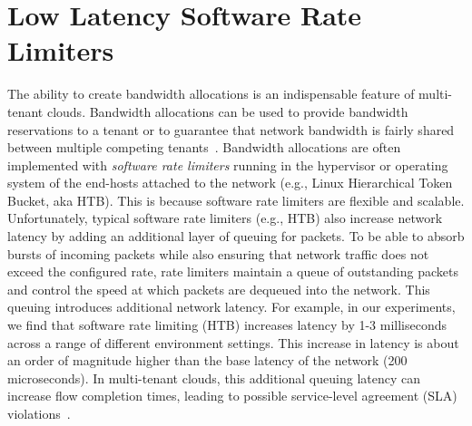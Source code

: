 \section{Low Latency Software Rate Limiters}
The ability to create bandwidth allocations is an indispensable feature
of multi-tenant clouds.  Bandwidth allocations can be used to provide
bandwidth reservations to a tenant or to guarantee that network
bandwidth is fairly shared between multiple competing
tenants~\cite{shieh2011sharing,jeyakumar2013eyeq,rodrigues2011gatekeeper}.
Bandwidth allocations are often implemented with \textit{software rate
limiters} running in the hypervisor or operating system
of the end-hosts attached to the network (e.g., Linux Hierarchical Token
Bucket, aka HTB).  This is because software rate limiters are flexible
and scalable.
Unfortunately, typical software rate limiters (e.g., HTB) also increase
network latency by adding an additional layer of queuing for packets.
To be able to absorb bursts of incoming packets while also ensuring that
network traffic does not exceed the configured rate, rate limiters
maintain a queue of outstanding packets and control the speed at which
packets are dequeued into the network.  This queuing introduces
additional network latency.  For example, in our experiments, we find
that software rate limiting (HTB) increases latency by 1-3 milliseconds
across a range of different environment settings. This increase in
latency is about an order of magnitude higher than the base latency of
the network (200 microseconds). In multi-tenant clouds, this additional queuing
latency can increase flow completion times, leading to possible
service-level agreement (SLA) violations~\cite{wilson2011better}.

